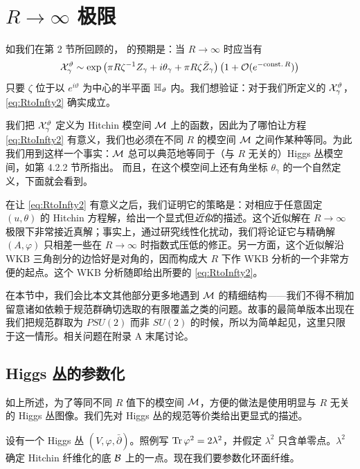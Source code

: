\section{$R\to\infty$ 极限}\label{sec:R-To-Infinity}

如我们在第 2 节所回顾的，%
\cite{Gaiotto:2008cd} 的预期是：当 $R\to\infty$ 时应当有
\begin{equation}\label{eq:RtoInfty2}
\mathcal{X}_{\gamma}^\vartheta \sim \exp\left(\pi R\zeta^{-1}Z_\gamma + i\theta_\gamma + \pi R\zeta\bar Z_\gamma\right)\left(1+\mathcal{O}(e^{-\mathrm{const.}\,R})\right)
\end{equation}
只要 $\zeta$ 位于以 $e^{i\vartheta}$ 为中心的半平面 ${\mathbb{H}}_\vartheta$ 内。我们想验证：对于我们所定义的 $\mathcal{X}_\gamma^\vartheta$，\eqref{eq:RtoInfty2} 确实成立。

我们把 $\mathcal{X}_\gamma^\vartheta$ 定义为 Hitchin 模空间 $\mathcal{M}$ 上的函数，因此为了哪怕让方程 \eqref{eq:RtoInfty2} 有意义，我们也必须在不同 $R$ 的模空间 $\mathcal{M}$ 之间作某种等同。为此我们用到这样一个事实：$\mathcal{M}$ 总可以典范地等同于（与 $R$ 无关的）Higgs 丛模空间，如第 4.2.2 节所指出。%
而且，在这个模空间上还有角坐标 $\theta_\gamma$ 的一个自然定义，下面就会看到。

在让 \eqref{eq:RtoInfty2} 有意义之后，我们证明它的策略是：对相应于任意固定 $(u,\theta)$ 的 Hitchin 方程解，给出一个显式但\emph{近似}的描述。这个近似解在 $R\to\infty$ 极限下非常接近真解；事实上，通过研究线性化扰动，我们将论证它与精确解 $(A,\varphi)$ 只相差一些在 $R\to\infty$ 时指数式压低的修正。另一方面，这个近似解沿 WKB 三角剖分的边恰好是对角的，因而构成大 $R$ 下作 WKB 分析的一个非常方便的起点。这个 WKB 分析随即给出所要的 \eqref{eq:RtoInfty2}。

在本节中，我们会比本文其他部分更多地遇到 $\mathcal{M}$ 的精细结构——我们不得不稍加留意诸如依赖于规范群确切选取的有限覆盖之类的问题。故事的最简单版本出现在我们把规范群取为 $PSU(2)$ 而非 $SU(2)$ 的时候，所以为简单起见，这里只限于这一情形。相关问题在附录 A 末尾讨论。%

\subsection{Higgs 丛的参数化} \label{sec:higgs-param}

如上所述，为了等同不同 $R$ 值下的模空间 $\mathcal{M}$，方便的做法是使用明显与 $R$ 无关的 Higgs 丛图像。我们先对 Higgs 丛的规范等价类给出更显式的描述。

设有一个 Higgs 丛 $(V,\varphi,\bar\partial)$。照例写 $\operatorname{Tr}\varphi^2 = 2\lambda^2$，并假定 $\lambda^2$ 只含单零点。$\lambda^2$ 确定 Hitchin 纤维化的底 $\mathcal{B}$ 上的一点。现在我们要参数化环面纤维。

